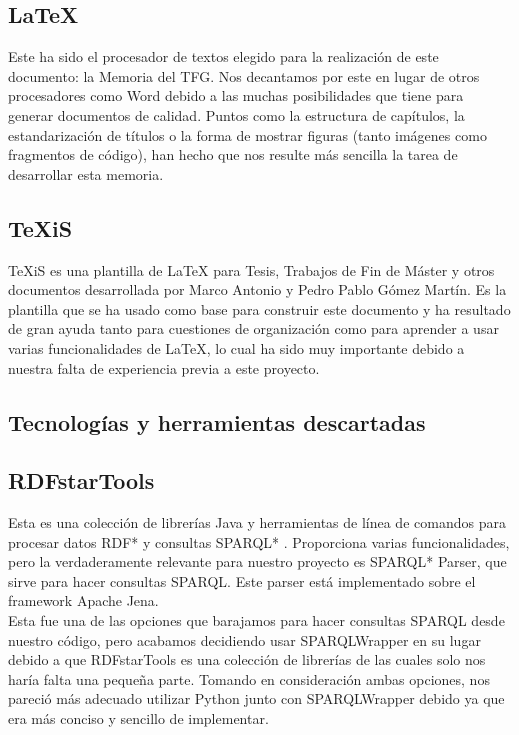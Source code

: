 \subsection*{LaTeX}

Este ha sido el procesador de textos elegido para la realización de este documento: la Memoria del TFG. Nos decantamos por este en lugar de otros procesadores como Word debido a las muchas posibilidades que tiene para generar documentos de calidad. Puntos como la estructura de capítulos, la estandarización de títulos o la forma de mostrar figuras (tanto imágenes como fragmentos de código), han hecho que nos resulte más sencilla la tarea de desarrollar esta memoria.

\subsection*{TeXiS}

TeXiS es una plantilla de LaTeX para Tesis, Trabajos de Fin de Máster y otros documentos desarrollada por Marco Antonio y Pedro Pablo Gómez Martín. Es la plantilla que se ha usado como base para construir este documento y ha resultado de gran ayuda tanto para cuestiones de organización como para aprender a usar varias funcionalidades de LaTeX, lo cual ha sido muy importante debido a nuestra falta de experiencia previa a este proyecto.

\subsection{Tecnologías y herramientas descartadas}

\subsection*{RDFstarTools}

Esta es una colección de librerías Java y herramientas de línea de comandos para procesar datos RDF* y consultas SPARQL* \cite{rdfstartools}. Proporciona varias funcionalidades, pero la verdaderamente relevante para nuestro proyecto es SPARQL* Parser, que sirve para hacer consultas SPARQL. Este parser está implementado sobre el framework Apache Jena.\\


Esta fue una de las opciones que barajamos para hacer consultas SPARQL desde nuestro código, pero acabamos decidiendo usar SPARQLWrapper en su lugar debido a que RDFstarTools es una colección de librerías de las cuales solo nos haría falta una pequeña parte. Tomando en consideración ambas opciones, nos pareció más adecuado utilizar Python junto con SPARQLWrapper debido ya que era más conciso y sencillo de implementar.

